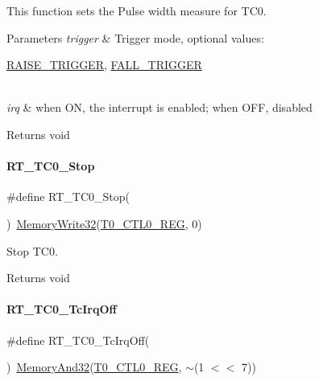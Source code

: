 This function sets the Pulse width measure for T\+C0. 


\begin{DoxyParams}{Parameters}
{\em trigger} & Trigger mode, optional values\+:
\begin{DoxyCode}
\mbox{\hyperlink{a00026_abda90eda34a640b130f48a6ade23fe22}{RAISE\_TRIGGER}}, \mbox{\hyperlink{a00026_a9bbaf5b9e2125c7597249c7113b20e6c}{FALL\_TRIGGER}}
\end{DoxyCode}
 \\
\hline
{\em irq} & when ON, the interrupt is enabled; when O\+FF, disabled \\
\hline
\end{DoxyParams}
\begin{DoxyReturn}{Returns}
void 
\end{DoxyReturn}
\mbox{\label{a00077_a7eb236125fa1773036d72e020419f3ad}} 
\paragraph{\texorpdfstring{R\+T\+\_\+\+T\+C0\+\_\+\+Stop}{RT\_TC0\_Stop}}
{\footnotesize\ttfamily \#define R\+T\+\_\+\+T\+C0\+\_\+\+Stop(\begin{DoxyParamCaption}{ }\end{DoxyParamCaption})~\mbox{\hyperlink{a00026_a6b9732365b12e48ddb89fe1028b975b0}{Memory\+Write32}}(\mbox{\hyperlink{a00026_ac94b0659ef32086a6752672082c0b3ed}{T0\+\_\+\+C\+T\+L0\+\_\+\+R\+EG}}, 0)}



Stop T\+C0. 

\begin{DoxyReturn}{Returns}
void 
\end{DoxyReturn}
\mbox{\label{a00077_a7434ed75487de93c69569c05430967ae}} 
\paragraph{\texorpdfstring{R\+T\+\_\+\+T\+C0\+\_\+\+Tc\+Irq\+Off}{RT\_TC0\_TcIrqOff}}
{\footnotesize\ttfamily \#define R\+T\+\_\+\+T\+C0\+\_\+\+Tc\+Irq\+Off(\begin{DoxyParamCaption}{ }\end{DoxyParamCaption})~\mbox{\hyperlink{a00026_ad87cedffcaadc51db22594fce55173d4}{Memory\+And32}}(\mbox{\hyperlink{a00026_ac94b0659ef32086a6752672082c0b3ed}{T0\+\_\+\+C\+T\+L0\+\_\+\+R\+EG}}, $\sim$(1 $<$$<$ 7))}



